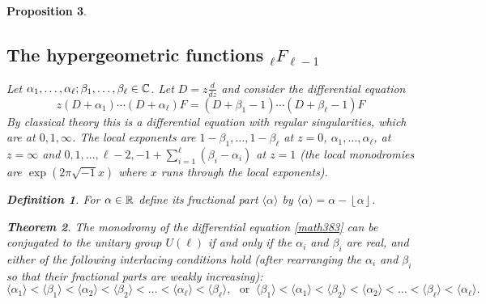 \documentclass[11pt]{amsart}
\newcommand\ma{\mathcal{A}}
\newtheorem{theorem}{Theorem}[section]
\newtheorem{proposition}[theorem]{Proposition}
\newtheorem{defi}[theorem]{Definition}
\numberwithin{theorem}{subsection}
\begin{document}
{\begin{proposition}
\subsection{The hypergeometric functions ${}_{\ell}F_{\ell-1}$}\label{hyper}
Let $\alpha_1,\dots,\alpha_{\ell};\beta_1,\dots,\beta_{\ell}\in \Bbb{C}$. Let $D=z\frac{d}{dz}$ and consider the differential equation
\begin{equation}\label{math383}
z(D+\alpha_1)\cdots (D+\alpha_{\ell})F=(D+\beta_1-1)\cdots (D+\beta_{\ell}-1)F
\end{equation}
By classical theory this is a differential equation with regular singularities, which are at $0,1,\infty$.
The local exponents are $1-\beta_1,\dots,1-\beta_{\ell}$ at $z=0$, $\alpha_1,\dots,\alpha_{\ell}$, at $z=\infty$ and
$0,1,\dots,\ell-2, -1+ \sum_{i=1}^{\ell}(\beta_i-\alpha_i)$ at $z=1$ (the local monodromies are $\exp(2\pi\sqrt{-1}x)$ where $x$ runs through the local exponents).
\begin{defi}
For $\alpha\in \Bbb{R}$ define its fractional part $\langle \alpha\rangle$ by $\langle \alpha\rangle=\alpha-\left \lfloor{\alpha}\right \rfloor $.
\end{defi}

\begin{theorem}\label{BHhere}\cite[Corollary 4.7]{BH}
The monodromy of the differential equation \eqref{math383} can be conjugated to the unitary group $U(\ell)$ if and only if the $\alpha_i$ and $\beta_i$ are real, and
either of the following interlacing conditions hold (after rearranging the $\alpha_i$ and $\beta_i$ so that their fractional parts are weakly increasing):
$$\langle\alpha_1\rangle <\langle\beta_1\rangle<\langle\alpha_2\rangle <\langle\beta_2\rangle<\dots<\langle\alpha_{\ell}\rangle <\langle\beta_{\ell}\rangle,\ \ \ \text {or }\ \langle\beta_1\rangle<\langle\alpha_1\rangle <\langle\beta_2\rangle<\langle\alpha_2\rangle <\dots<\langle\beta_{\ell}\rangle<\langle\alpha_{\ell}\rangle .$$
\end{theorem}

\end{proposition}}
\end{document}
